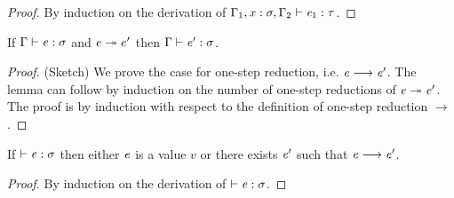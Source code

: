 \begin{proof}
    By induction on the derivation of $\Gamma_{{\mathrm{1}}}  ,  \mathit{x}  :  \sigma  ,  \Gamma_{{\mathrm{2}}}  \vdash  \mathit{e_{{\mathrm{1}}}}  :  \tau$.
\end{proof}

\begin{lem}
If $\Gamma  \vdash  \mathit{e}  :  \sigma$ and $\mathit{e}  \twoheadrightarrow  e'$ then $\Gamma  \vdash  \mathit{e'}  :  \sigma$.
\end{lem}

\begin{proof}
    (Sketch) We prove the case for one-step reduction, i.e. $\mathit{e}  \longrightarrow  \mathit{e'}$. The lemma can follow by induction on the number of one-step reductions of $\mathit{e}  \twoheadrightarrow  \mathit{e'}$.
    The proof is by induction with respect to the definition of one-step reduction $ \longrightarrow $.
\end{proof}

\begin{lem}[Progress]
If $\vdash  \mathit{e}  :  \sigma$ then either $\mathit{e}$ is a value $v$ or there exists $\mathit{e}'$ such that $\mathit{e}  \longrightarrow  \mathit{e'}$.
\end{lem}

\begin{proof}
    By induction on the derivation of $\vdash  \mathit{e}  :  \sigma$.
\end{proof}
